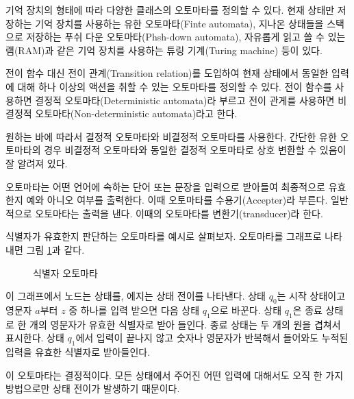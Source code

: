 \documentclass[a4paper]{book}
\begin{document}
기억 장치의 형태에 따라 다양한 클래스의 오토마타를 정의할 수
있다. 현재 상태만 저장하는 기억 장치를 사용하는 유한 오토마타(Finte
automata), 지나온 상태들을 스택으로 저장하는 푸쉬 다운
오토마타(Phsh-down automata), 자유롭게 읽고 쓸 수 있는 램(RAM)과 같은
기억 장치를 사용하는 튜링 기계(Turing machine) 등이 있다.

전이 함수 대신 전이 관계(Transition relation)를 도입하여 현재 상태에서
동일한 입력에 대해 하나 이상의 액션을 취할 수 있는 오토마타를 정의할
수 있다. 전이 함수를 사용하면 결정적 오토마타(Deterministic
automata)라 부르고 전이 관게를 사용하면 비결정적
오토마타(Non-deterministic automata)라고 한다.

원하는 바에 따라서 결정적 오토마타와 비결정적 오토마타를 사용한다.
간단한 유한 오토마타의 경우 비결정적 오토마타와 동일한 결정적
오토마타로 상호 변환할 수 있음이 잘 알려져 있다.

오토마타는 어떤 언어에 속하는 단어 또는 문장을 입력으로 받아들여
최종적으로 유효한지 예와 아니오 여부를 출력한다. 이때 오토마타를
수용기(Accepter)라 부른다. 일반적으로 오토마타는 출력을 낸다. 이때의
오토마타를 변환기(transducer)라 한다.

식별자가 유효한지 판단하는 오토마타를 예시로 살펴보자. 오토마타를
그래프로 나타내면 그림 \ref{fig:identifierautumatagraph}과 같다.

\begin{figure}[ht]
\begin{center}
\end{center}
\caption{식별자 오토마타}
\label{fig:identifierautumatagraph}
\end{figure}

이 그래프에서 노드는 상태를, 에지는 상태 전이를 나타낸다. 상태 $q_0$는
시작 상태이고 영문자 $a$부터 $z$ 중 하나를 입력 받으면 다음 상태
$q_1$으로 바꾼다. 상태 $q_1$은 종료 상태로 한 개의 영문자가 유효한
식별자로 받아 들인다. 종료 상태는 두 개의 원을 겹쳐서 표시한다. 상태
$q_1$에서 입력이 끝나지 않고 숫자나 영문자가 반복해서 들어와도 누적된
입력을 유효한 식별자로 받아들인다.

이 오토마타는 결정적이다.  모든 상태에서 주어진 어떤 입력에 대해서도
오직 한 가지 방법으로만 상태 전이가 발생하기 때문이다.
\end{document}
